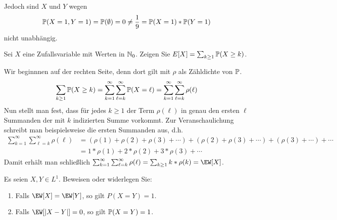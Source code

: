 \begin{exercisePage}
	Jedoch sind $X$ und $Y$ wegen
	\begin{equation*}
		\P(X = 1 , Y = 1) = \P(\emptyset) = 0 \neq \frac{1}{9} = \P(X=1) * \P(Y=1)
	\end{equation*}
	nicht unabhängig.
	
	
	\begin{homework}
		Sei $X$ eine Zufallsvariable mit Werten in $\N_0$. Zeigen Sie $E[X] = \sum_{k \ge 1} \P(X \ge k)$.
	\end{homework}

	Wir beginnnen auf der rechten Seite, denn dort gilt mit $\rho$ als Zähldichte von $\P$.
	\begin{equation*}
		\sum_{k \geq 1} \P(X \geq k) = \sum_{k = 1}^\infty \sum_{\ell = k}^\infty \P(X = \ell) = \sum_{k = 1}^\infty \sum_{\ell = k}^\infty \rho(\ell)
	\end{equation*}
	Nun stellt man fest, dass für jedes $k \ge 1$ der Term $\rho(\ell)$ in genau den ersten $\ell$ Summanden der mit $k$ indizierten Summe vorkommt. Zur Veranschaulichung schreibt man beispielsweise die ersten Summanden aus, d.h.
	\begin{equation*}
	\begin{aligned}
		\sum_{k = 1}^\infty \sum_{\ell = k}^\infty \rho(\ell) 
		&= \left( \rho(1) + \rho (2) + \rho(3) + \cdots \right) + \left( \rho(2) + \rho(3) + \cdots \right) + \left( \rho(3) + \cdots \right) + \cdots \\
		&= 1 * \rho(1) + 2 * \rho(2) + 3 * \rho(3) + \cdots 
	\end{aligned} 
	\end{equation*}
	Damit erhält man schließlich $\sum_{k = 1}^\infty \sum_{\ell = k}^\infty \rho(\ell) = \sum_{k \ge 1} k * \rho(k) = \EW[X]$.
	

	\begin{homework}
		Es seien $X,Y \in L^1$. Beweisen oder widerlegen Sie:
		\begin{enumerate}[leftmargin=*]
			\item Falls $\EW[X] = \EW[Y]$, so gilt $P(X = Y ) = 1$.
			\item Falls $\EW[\abs{X-Y}] = 0$, so gilt $\P(X=Y) = 1$.
		\end{enumerate}
	\end{homework}


\end{exercisePage}
